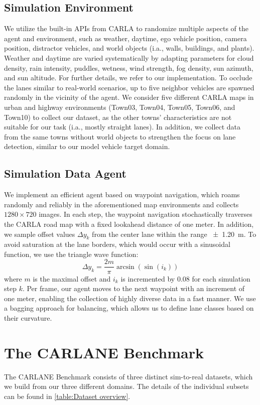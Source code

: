 \documentclass{article}
\begin{document}
	\subsection{Simulation Environment}
	We utilize the built-in APIs from CARLA to randomize multiple aspects of the agent and environment, such as weather, daytime, ego vehicle position, camera position, distractor vehicles, and world objects (i.a., walls, buildings, and plants). Weather and daytime are varied systematically by adapting parameters for cloud density, rain intensity, puddles, wetness, wind strength, fog density, sun azimuth, and sun altitude. For further details, we refer to our implementation. To occlude the lanes similar to real-world scenarios, up to five neighbor vehicles are spawned randomly in the vicinity of the agent. We consider five different CARLA maps in urban and highway environments (Town03, Town04, Town05, Town06, and Town10) to collect our dataset, as the other towns' characteristics are not suitable for our task (i.a., mostly straight lanes). In addition, we collect data from the same towns without world objects to strengthen the focus on lane detection, similar to our model vehicle target domain.
	
	\subsection{Simulation Data Agent}
	We implement an efficient agent based on waypoint navigation, which roams randomly and reliably in the aforementioned map environments and collects $1280\times720$ images. In each step, the waypoint navigation stochastically traverses the CARLA road map with a fixed lookahead distance of one meter. 
	In addition, we sample offset values $\Delta y_k$ from the center lane within the range \SI{\pm 1.20}{\metre}.
	To avoid saturation at the lane borders, which would occur with a sinusoidal function, we use the triangle wave function:
	\begin{equation}
		\Delta y_k =\frac{2m}{\pi}\arcsin(\sin(i_k))
	\end{equation}
	where $m$ is the maximal offset and $i_k$ is incremented by $0.08$ for each simulation step $k$. Per frame, our agent moves to the next waypoint with an increment of one meter, enabling the collection of highly diverse data in a fast manner. We use a bagging approach for balancing, which allows us to define lane classes based on their curvature.
	
	\section{The CARLANE Benchmark}
	\label{sec:CARLANE}
	The CARLANE Benchmark consists of three distinct sim-to-real datasets, which we build from our three different domains. The details of the individual subsets can be found in \autoref{table:Dataset overview}.
	
\end{document}
